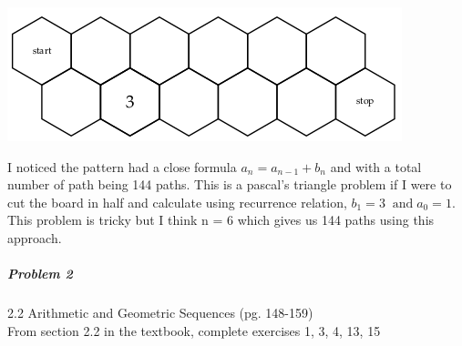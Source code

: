\documentclass[11pt,a4paper]{article}
\begin{document}
\begin{enumerate}
            \begin{center}
            \includegraphics[width=.5\textwidth]{hw6_graphic1}
            \end{center}

            I noticed the pattern had a close formula $a_n = a_{n-1} + b_n$ and with a total number of path being 144 paths. This is a pascal's triangle problem if I were to cut the board in half and calculate using recurrence relation, $b_1 = 3\;\;\text{and}\; a_0 = 1$. This problem is tricky but I think n = 6  which gives us 144 paths using this approach.
	
        \end{enumerate}

	\subparagraph{Problem 2} 2.2 Arithmetic and Geometric Sequences (pg. 148-159)\\
	
		From section 2.2 in the textbook, complete exercises 1, 3, 4, 13, 15
	
\end{document}
